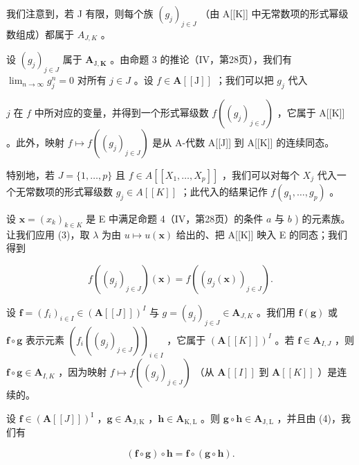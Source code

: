 我们注意到，若 J 有限，则每个族 \((g_{j})_{j\in J}\) （由 A{[}{[}K{]}{]} 中无常数项的形式幂级数组成）都属于 \(A_{J,K}\) 。

设 \((g_j)_{j\in J}\) 属于 \(\mathbf{A}_{\mathrm{J},\mathbf{K}}\) 。由命题 3 的推论（IV，第28页），我们有 \(\lim_{n\to \infty}g_j^n = 0\) 对所有 \(j\in J\) 。设 \(f\in \mathbf{A}[[\mathrm{J}]]\) ；我们可以把 \(g_{j}\) 代入

 \(j\) 在 \(f\) 中所对应的变量，并得到一个形式幂级数 \(f((g_j)_{j \in J})\) ，它属于 A{[}{[}K{]}{]} 。此外，映射 \(f \mapsto f((g_j)_{j \in J})\) 是从 A-代数 A{[}{[}J{]}{]} 到 A{[}{[}K{]}{]} 的连续同态。

特别地，若 \(J = \{1, \ldots, p\}\) 且 \(f \in A[[X_1, \ldots, X_p]]\) ，我们可以对每个 \(X_j\) 代入一个无常数项的形式幂级数 \(g_j \in A[[K]]\) ；此代入的结果记作 \(f(g_1, \ldots, g_p)\) 。

设 \(\mathbf{x} = (x_k)_{k\in K}\) 是 E 中满足命题 4（IV，第28页）的条件 \(a\) 与 \(b\) ) 的元素族。让我们应用 (3)，取 \(\lambda\) 为由 \(u\mapsto u(\mathbf{x})\) 给出的、把 A{[}{[}K{]}{]} 映入 E 的同态；我们得到

\[
f \left(\left(g _ {j}\right) _ {j \in J}\right) (\mathbf {x}) = f \left(\left(g _ {j} (\mathbf {x})\right) _ {j \in J}\right).\tag{4}
\]

设 \(\mathbf{f} = (f_i)_{i\in I}\in (\mathbf{A}[[J]])^I\) 与 \(g = (g_j)_{j\in J}\in \mathbf{A}_{J,K}\) 。我们用 \(\mathbf{f}(\mathbf{g})\) 或 \(\mathbf{f}\circ \mathbf{g}\) 表示元素 \((f_{i}((g_{j})_{j\in J}))_{i\in I}\) ，它属于 \((\mathbf{A}[[K]])^I\) 。若 \(\mathbf{f}\in \mathbf{A}_{I,J}\) ，则 \(\mathbf{f}\circ \mathbf{g}\in \mathbf{A}_{I,K}\) ，因为映射 \(f\mapsto f((g_j)_{j\in J})\) （从 \(\mathbf{A}[[I]]\) 到 \(\mathbf{A}[[K]]\) ）是连续的。

设 \(\mathbf{f} \in (\mathbf{A}[[J]])^{\mathrm{I}}\) ，\(\mathbf{g} \in \mathbf{A}_{\mathrm{J},\mathrm{K}}\) ，\(\mathbf{h} \in \mathbf{A}_{\mathrm{K},\mathrm{L}}\) 。则 \(\mathbf{g} \circ \mathbf{h} \in \mathbf{A}_{\mathrm{J},\mathrm{L}}\) ，并且由 (4)，我们有

\[
(\mathbf {f} \circ \mathbf {g}) \circ \mathbf {h} = \mathbf {f} \circ (\mathbf {g} \circ \mathbf {h}).\tag{5}
\]

